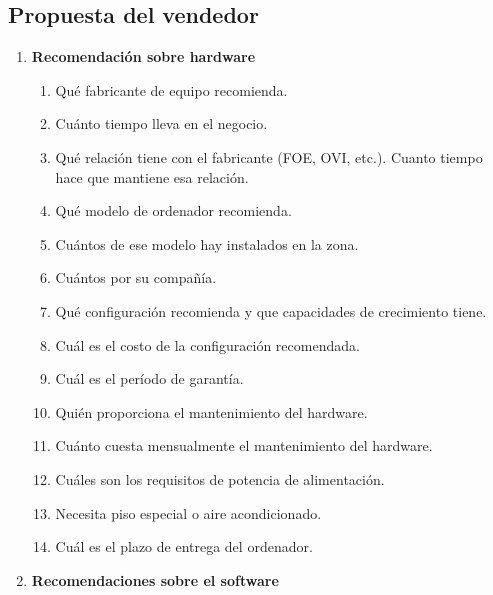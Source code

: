 \subsection{Propuesta del vendedor}

\renewcommand{\labelenumi}{\arabic{enumi}.}
\begin{enumerate}
  
  \item \textbf{Recomendación sobre hardware}
  
    \begin{enumerate}
      \item Qué fabricante de equipo recomienda.
      \item Cuánto tiempo lleva en el negocio.
      \item Qué relación tiene con el fabricante (FOE, OVI, etc.). Cuanto tiempo
hace que mantiene esa relación.
      \item Qué modelo de ordenador recomienda.
      \item Cuántos de ese modelo hay instalados en la zona.
      \item Cuántos por su compañía.
      \item Qué configuración recomienda y que capacidades de crecimiento tiene.
      \item Cuál es el costo de la configuración recomendada.
      \item Cuál es el período de garantía.
      \item Quién proporciona el mantenimiento del hardware.
      \item Cuánto cuesta mensualmente el mantenimiento del hardware.
      \item Cuáles son los requisitos de potencia de alimentación.
      \item Necesita piso especial o aire acondicionado.
      \item Cuál es el plazo de entrega del ordenador.
    \end{enumerate}

  \item \textbf{Recomendaciones sobre el software}
    

\end{enumerate}
